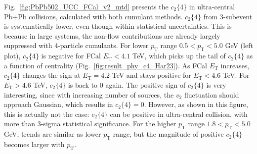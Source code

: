 Fig.~\ref{fig:PbPb502_UCC_FCal_v2_mtd} presents the $c_2\{4\}$ in ultra-central Pb+Pb collisions, calculated with both cumulant methods. $c_2\{4\}$ from 3-subevent is systematically lower, even though within statistical uncertainties. This is because in large systems, the non-flow contributions are already largely suppressed with 4-particle cumulants. For lower $p_\text{T}$ range $0.5<p_\text{T}<5.0$ GeV (left plot), $c_2\{4\}$ is negative for FCal $E_\text{T}<4.1$ TeV, which picks up the tail of $c_2\{4\}$ as a function of centrality (Fig.~\ref{fig:result_phy_c4_Har23}). As FCal $E_\text{T}$ increases, $c_2\{4\}$ changes the sign at $E_\text{T}=4.2$ TeV and stays positive for $E_\text{T}<4.6$ TeV. For $E_\text{T}>4.6$ TeV, $c_2\{4\}$ is back to 0 again. The positive sign of $c_2\{4\}$ is very interesting, since with increasing number of sources, the $v_2$ fluctuation should approach Gaussian, which results in $c_2\{4\}=0$. However, as shown in this figure, this is actually not the case: $c_2\{4\}$ can be positive in ultra-central collision, with more than 3-sigma statistical significance. For the higher $p_\text{T}$ range $1.8<p_\text{T}<5.0$ GeV, trends are similar as lower $p_\text{T}$ range, but the magnitude of positive $c_2\{4\}$ becomes larger with $p_\text{T}$.
